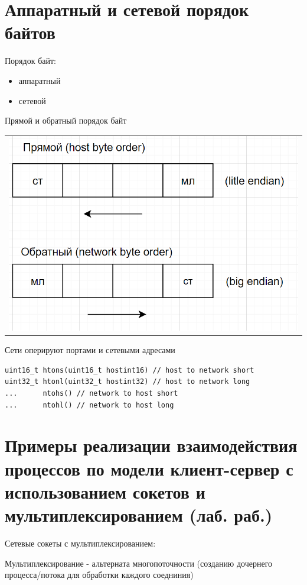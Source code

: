 \section{Аппаратный и сетевой порядок байтов}

Порядок байт:

\begin{itemize}
\item аппаратный
\item сетевой
\end{itemize}

Прямой и обратный порядок байт

  \begin{table}[H]
  \centering
  \begin{tabular}{p{1\linewidth}}
    \centering
    \includegraphics[width=0.8\linewidth]{./images/3.png}
  \end{tabular}
\end{table}

Сети оперируют портами и сетевыми адресами

\begin{lstlisting}
uint16_t htons(uint16_t hostint16) // host to network short
uint32_t htonl(uint32_t hostint32) // host to network long
...      ntohs() // network to host short
...      ntohl() // network to host long
\end{lstlisting}

\section{Примеры реализации взаимодействия процессов по модели клиент-сервер с использованием сокетов и мультиплексированием (лаб. раб.)}

Сетевые сокеты с мультиплексированием:

Мультиплексирование - альтерната многопоточности (созданию дочернего процесса/потока для обработки каждого соедниния)

